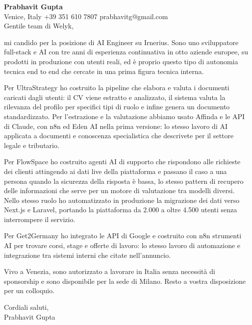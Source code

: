 \documentclass[a4paper,10.5pt]{article}
\begin{document}
\textbf{Prabhavit Gupta}\\
Venice, Italy \textbar{} +39 351 610 7807 \textbar{} prabhavitg@gmail.com\\[10pt]
Gentile team di Welyk,

mi candido per la posizione di AI Engineer su Irnerius. Sono uno sviluppatore full-stack e AI con tre anni di esperienza continuativa in otto aziende europee, su prodotti in produzione con utenti reali, ed è proprio questo tipo di autonomia tecnica end to end che cercate in una prima figura tecnica interna.

Per UltraStrategy ho costruito la pipeline che elabora e valuta i documenti caricati dagli utenti: il CV viene estratto e analizzato, il sistema valuta la rilevanza del profilo per specifici tipi di ruolo e infine genera un documento standardizzato. Per l'estrazione e la valutazione abbiamo usato Affinda e le API di Claude, con n8n ed Eden AI nella prima versione: lo stesso lavoro di AI applicata a documenti e conoscenza specialistica che descrivete per il settore legale e tributario.

Per FlowSpace ho costruito agenti AI di supporto che rispondono alle richieste dei clienti attingendo ai dati live della piattaforma e passano il caso a una persona quando la sicurezza della risposta è bassa, lo stesso pattern di recupero delle informazioni che serve per un motore di valutazione tra modelli diversi. Nello stesso ruolo ho automatizzato in produzione la migrazione dei dati verso Next.js e Laravel, portando la piattaforma da 2.000 a oltre 4.500 utenti senza interrompere il servizio.

Per Get2Germany ho integrato le API di Google e costruito con n8n strumenti AI per trovare corsi, stage e offerte di lavoro: lo stesso lavoro di automazione e integrazione tra sistemi interni che citate nell'annuncio.

Vivo a Venezia, sono autorizzato a lavorare in Italia senza necessità di sponsorship e sono disponibile per la sede di Milano. Resto a vostra disposizione per un colloquio.

Cordiali saluti,\\
Prabhavit Gupta
\end{document}
